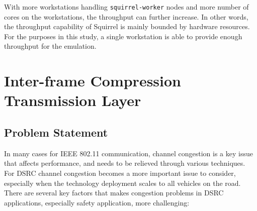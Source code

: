 \documentclass[12pt]{report}
\begin{document}
With more workstations handling \texttt{squirrel-worker} nodes and more number of cores on the workstations, the throughput can further increase. In other words, the throughput capability of Squirrel is mainly bounded by hardware resources. For the purposes in this study, a single workstation is able to provide enough throughput for the emulation.

\chapter{Inter-frame Compression Transmission Layer}

\section{Problem Statement}
\label{sec:problem_congestion}

In many cases for IEEE 802.11 communication, channel congestion is a key issue that affects performance, and needs to be relieved through various techniques. For DSRC channel congestion becomes a more important issue to consider, especially when the technology deployment scales to all vehicles on the road. There are several key factors that makes congestion problems in DSRC applications, especially safety application, more challenging:
\end{document}
